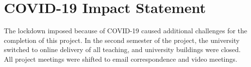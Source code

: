 \chapter{COVID-19 Impact Statement}
The lockdown imposed because of COVID-19 caused additional challenges for the completion of this project. In the second semester of the project, the university switched to online delivery of all teaching, and university buildings were closed. All project meetings were shifted to email correspondence and video meetings.